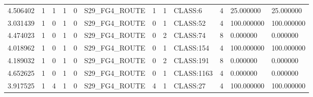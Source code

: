 \begin{tabular}{llllllllllll}
4.506402 & 1 & 1 & 1 & 0 & S29\_FG4\_ROUTE & 1 & 1 & CLASS:6 & 4 & 25.000000 & 25.000000 \\
3.031439 & 1 & 0 & 1 & 0 & S29\_FG4\_ROUTE & 0 & 1 & CLASS:52 & 4 & 100.000000 & 100.000000 \\
4.474023 & 1 & 0 & 1 & 0 & S29\_FG4\_ROUTE & 0 & 2 & CLASS:74 & 8 & 0.000000 & 0.000000 \\
4.018962 & 1 & 0 & 1 & 0 & S29\_FG4\_ROUTE & 0 & 1 & CLASS:154 & 4 & 100.000000 & 100.000000 \\
4.189032 & 1 & 0 & 1 & 0 & S29\_FG4\_ROUTE & 0 & 2 & CLASS:191 & 8 & 0.000000 & 0.000000 \\
4.652625 & 1 & 0 & 1 & 0 & S29\_FG4\_ROUTE & 0 & 1 & CLASS:1163 & 4 & 0.000000 & 0.000000 \\
3.917525 & 1 & 4 & 1 & 0 & S29\_FG4\_ROUTE & 4 & 1 & CLASS:27 & 4 & 100.000000 & 100.000000 \\
\bottomrule
\end{tabular}
